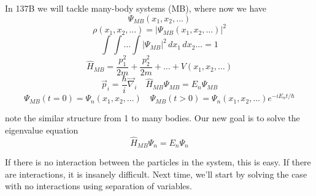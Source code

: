 \documentclass[11pt]{article}
\begin{document}
In 137B we will tackle many-body systems (MB), where now we have
\[\Psi_{MB}(x_1, x_2, \ldots)\]
\[\rho(x_1, x_2, \ldots) = |\Psi_{MB}(x_1, x_2, \ldots)|^2\]
\[\int\int\ldots\int |\Psi_{MB}|^2 \, dx_1\, dx_2\ldots = 1\]
\[\hat{H}_{MB} = \frac{p_1^2}{2m} + \frac{p_2^2}{2m} + \ldots + V(x_1, x_2, \ldots)\]
\[\vec{p}_i = \frac{\hbar}{i}\vec{\nabla}_i \quad \hat{H}_{MB}\Psi_{MB} = E_n \Psi_{MB}\]
\[\Psi_{MB}(t=0) = \Psi_n(x_1, x_2, \ldots) \quad \Psi_{MB}(t > 0) = \Psi_n(x_1, x_2, \ldots)e^{-iE_nt/\hbar}\]

note the similar structure from 1 to many bodies. Our new goal is to solve the eigenvalue equation
\[\hat{H}_{MB} \Psi_n = E_n\Psi_n\]

If there is no interaction between the particles in the system, this is easy. If there are interactions, it is insanely difficult. Next time, we'll start by solving the case with no interactions using separation of variables.
\end{document}
